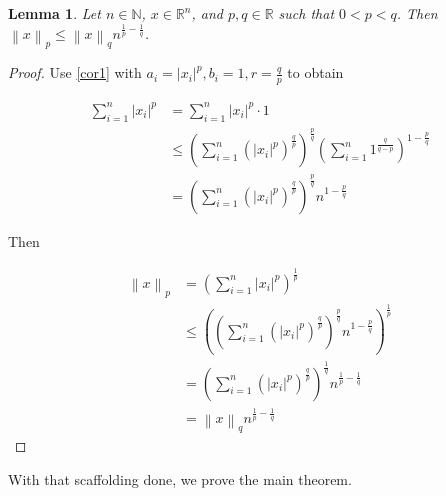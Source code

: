 \documentclass[11pt]{amsart}
\newtheorem{lemma}[theorem]{Lemma}
\newcommand{\norm}[1]{\left\lVert #1 \right\rVert}
\begin{document}
\begin{lemma}\label{lem1}
Let $n \in \mathbb{N}$, $x \in \mathbb{R}^n$, and $p, q \in \mathbb{R}$ such that $0 < p < q$. Then $\norm{x}_p \le \norm{x}_q n^{\frac{1}{p} - \frac{1}{q}}$.
\end{lemma}
\begin{proof}
Use \ref{cor1} with $a_i = |x_i|^p, b_i = 1, r = \frac{q}{p}$ to obtain

\begin{align*}
\sum_{i = 1}^n |x_i|^p &= \sum_{i = 1}^n |x_i|^p \cdot 1\\
                       &\le \left(\sum_{i=1}^n \left(|x_i|^p\right)^{\frac{q}{p}}\right)^{\frac{p}{q}} \left(\sum_{i=1}^n 1^{\frac{q}{q-p}}\right)^{1 - \frac{p}{q}}\\
                       &= \left(\sum_{i=1}^n \left(|x_i|^p\right)^{\frac{q}{p}}\right)^{\frac{p}{q}} n^{1 - \frac{p}{q}}
\end{align*}

Then

\begin{align*}
\norm{x}_p &= \left(\sum_{i=1}^n |x_i|^p \right)^{\frac{1}{p}}\\
           &\le \left(\left(\sum_{i=1}^n \left(|x_i|^p\right)^{\frac{q}{p}}\right)^{\frac{p}{q}} n^{1 - \frac{p}{q}}\right)^{\frac{1}{p}}\\
           &= \left(\sum_{i=1}^n \left(|x_i|^p\right)^{\frac{q}{p}}\right)^{\frac{1}{q}} n^{\frac{1}{p} - \frac{1}{q}}\\
           &= \norm{x}_q n^{\frac{1}{p} - \frac{1}{q}}
\end{align*}
\end{proof}

With that scaffolding done, we prove the main theorem.
\end{document}
